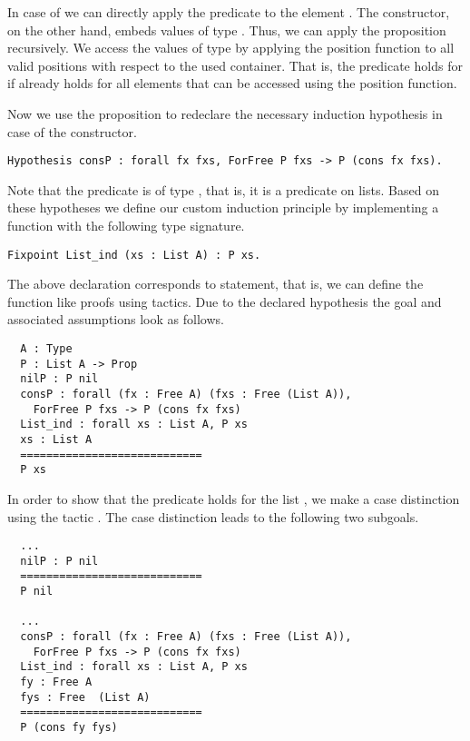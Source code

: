 In case of  we can directly apply the predicate to the element .
The  constructor, on the other hand, embeds values of type .
Thus, we can apply the proposition  recursively.
We access the values of type  by applying the position function to all valid positions with respect to the used container.
That is, the predicate holds for  if  already holds for all elements that can be accessed using the position function.

Now we use the proposition  to redeclare the necessary induction hypothesis in case of the  constructor.

\begin{verbatim}
Hypothesis consP : forall fx fxs, ForFree P fxs -> P (cons fx fxs).
\end{verbatim}

Note that the predicate  is of type , that is, it is a predicate on lists.
Based on these hypotheses we define our custom induction principle by implementing a function with the following type signature.

\begin{verbatim}
Fixpoint List_ind (xs : List A) : P xs.
\end{verbatim}

\noindent%
The above declaration corresponds to  statement, that is, we can define the function like proofs using tactics.
Due to the declared hypothesis the goal and associated assumptions look as follows.

\begin{verbatim}
  A : Type
  P : List A -> Prop
  nilP : P nil
  consP : forall (fx : Free A) (fxs : Free (List A)),
    ForFree P fxs -> P (cons fx fxs)
  List_ind : forall xs : List A, P xs
  xs : List A
  ============================
  P xs
\end{verbatim}

In order to show that the predicate  holds for the list , we make a case distinction using the tactic . The case distinction leads to the following two subgoals.

\begin{verbatim}
  ...
  nilP : P nil
  ============================
  P nil

  ...
  consP : forall (fx : Free A) (fxs : Free (List A)),
    ForFree P fxs -> P (cons fx fxs)
  List_ind : forall xs : List A, P xs
  fy : Free A
  fys : Free  (List A)
  ============================
  P (cons fy fys)
\end{verbatim}

